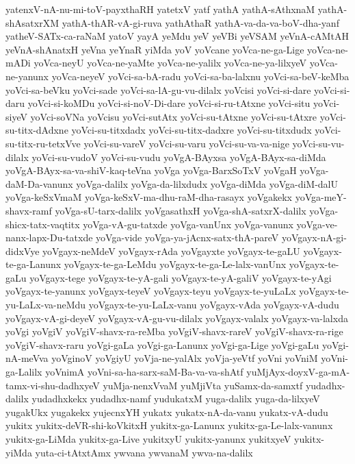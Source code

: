 {yatenxV-nA-nu-mi-toV-payxthaRH
yatetxV
yatf
yathA
yathA-sAthxnaM
yathA-shAsatxrXM
yathA-thAR-vA-gi-ruva
yathAthaR
yathA-va-da-va-boV-dha-yanf
yatheV-SATx-ca-raNaM
yatoV
yayA
yeMdu
yeV
yeVBi
yeVSAM
yeVnA-cAMtAH
yeVnA-shAnatxH
yeVna
yeYnaR
yiMda
yoV
yoVcane
yoVca-ne-ga-Lige
yoVca-ne-mADi
yoVca-neyU
yoVca-ne-yaMte
yoVca-ne-yalilx
yoVca-ne-ya-lilxyeV
yoVca-ne-yanunx
yoVca-neyeV
yoVci-sa-bA-radu
yoVci-sa-ba-lalxnu
yoVci-sa-beV-keMba
yoVci-sa-beVku
yoVci-sade
yoVci-sa-lA-gu-vu-dilalx
yoVcisi
yoVci-si-dare
yoVci-si-daru
yoVci-si-koMDu
yoVci-si-noV-Di-dare
yoVci-si-ru-tAtxne
yoVci-situ
yoVci-siyeV
yoVci-soVNa
yoVcisu
yoVci-sutAtx
yoVci-su-tAtxne
yoVci-su-tAtxre
yoVci-su-titx-dAdxne
yoVci-su-titxdadx
yoVci-su-titx-dadxre
yoVci-su-titxdudx
yoVci-su-titx-ru-tetxVve
yoVci-su-vareV
yoVci-su-varu
yoVci-su-va-va-nige
yoVci-su-vu-dilalx
yoVci-su-vudoV
yoVci-su-vudu
yoVgA-BAyxsa
yoVgA-BAyx-sa-diMda
yoVgA-BAyx-sa-va-shiV-kaq-teVna
yoVga
yoVga-BarxSoTxV
yoVgaH
yoVga-daM-Da-vanunx
yoVga-dalilx
yoVga-da-lilxdudx
yoVga-diMda
yoVga-diM-dalU
yoVga-keSxVmaM
yoVga-keSxV-ma-dhu-raM-dha-rasayx
yoVgakekx
yoVga-meY-shavx-ramf
yoVga-sU-tarx-dalilx
yoVgasathxH
yoVga-shA-satxrX-dalilx
yoVga-shicx-tatx-vaqtitx
yoVga-vA-gu-tatxde
yoVga-vanUnx
yoVga-vanunx
yoVga-ve-nanx-lapx-Du-tatxde
yoVga-vide
yoVga-ya-jAcnx-satx-thA-pareV
yoVgayx-nA-gi-didxVye
yoVgayx-neMdeV
yoVgayx-rAda
yoVgayxte
yoVgayx-te-gaLU
yoVgayx-te-ga-Lanunx
yoVgayx-te-ga-LeMdu
yoVgayx-te-ga-Le-lalx-vanUnx
yoVgayx-te-gaLu
yoVgayx-tege
yoVgayx-te-yA-gali
yoVgayx-te-yA-galiV
yoVgayx-te-yAgi
yoVgayx-te-yanunx
yoVgayx-teyeV
yoVgayx-teyu
yoVgayx-te-yuLaLx
yoVgayx-te-yu-LaLx-va-neMdu
yoVgayx-te-yu-LaLx-vanu
yoVgayx-vAda
yoVgayx-vA-dudu
yoVgayx-vA-gi-deyeV
yoVgayx-vA-gu-vu-dilalx
yoVgayx-valalx
yoVgayx-va-lalxda
yoVgi
yoVgiV
yoVgiV-shavx-ra-reMba
yoVgiV-shavx-rareV
yoVgiV-shavx-ra-rige
yoVgiV-shavx-raru
yoVgi-gaLa
yoVgi-ga-Lanunx
yoVgi-ga-Lige
yoVgi-gaLu
yoVgi-nA-meVva
yoVginoV
yoVgiyU
yoVja-ne-yalAlx
yoVja-yeVtf
yoVni
yoVniM
yoVni-ga-Lalilx
yoVnimA
yoVni-sa-ha-sarx-saM-Ba-va-va-shAtf
yuMjAyx-doyxV-ga-mA-tamx-vi-shu-dadhxyeV
yuMja-nenxVvaM
yuMjiVta
yuSamx-da-samxtf
yudadhx-dalilx
yudadhxkekx
yudadhx-namf
yudukatxM
yuga-dalilx
yuga-da-lilxyeV
yugakUkx
yugakekx
yujecnxYH
yukatx
yukatx-nA-da-vanu
yukatx-vA-dudu
yukitx
yukitx-deVR-shi-koVkitxH
yukitx-ga-Lanunx
yukitx-ga-Le-lalx-vanunx
yukitx-ga-LiMda
yukitx-ga-Live
yukitxyU
yukitx-yanunx
yukitxyeV
yukitx-yiMda
yuta-ci-tAtxtAmx
ywvana
ywvanaM
ywva-na-dalilx
‌
}
